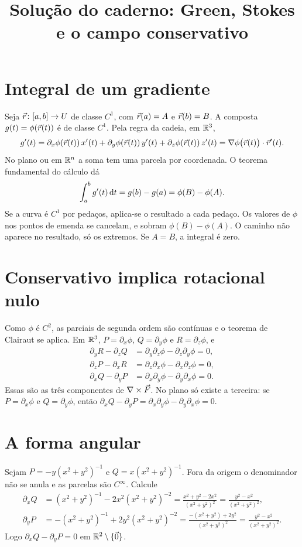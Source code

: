 \documentclass[11pt,a4paper]{article}
\title{Solução do caderno: Green, Stokes e o campo conservativo}
\author{}
\date{}
\begin{document}
\maketitle
\tableofcontents

\section{Integral de um gradiente}

Seja $\vec{r}\colon[a,b]\to U$ de classe $C^1$, com $\vec{r}(a)=A$ e $\vec{r}(b)=B$. A composta $g(t)=\phi(\vec{r}(t))$ é de classe $C^1$. Pela regra da cadeia, em $\mathbb{R}^3$,
\[
g'(t)
=\partial_x\phi(\vec{r}(t))\,x'(t)
+\partial_y\phi(\vec{r}(t))\,y'(t)
+\partial_z\phi(\vec{r}(t))\,z'(t)
=\nabla\phi\bigl(\vec{r}(t)\bigr)\cdot\vec{r}'(t).
\]
No plano ou em $\mathbb{R}^n$ a soma tem uma parcela por coordenada. O teorema fundamental do cálculo dá
\[
\int_a^b g'(t)\,\mathrm{d} t=g(b)-g(a)=\phi(B)-\phi(A).
\]
Se a curva é $C^1$ por pedaços, aplica-se o resultado a cada pedaço. Os valores de $\phi$ nos pontos de emenda se cancelam, e sobram $\phi(B)-\phi(A)$. O caminho não aparece no resultado, só os extremos. Se $A=B$, a integral é zero.

\section{Conservativo implica rotacional nulo}

Como $\phi$ é $C^2$, as parciais de segunda ordem são contínuas e o teorema de Clairaut se aplica. Em $\mathbb{R}^3$, $P=\partial_x\phi$, $Q=\partial_y\phi$ e $R=\partial_z\phi$, e
\begin{align*}
\partial_y R-\partial_z Q
&=\partial_y\partial_z\phi-\partial_z\partial_y\phi=0,\\
\partial_z P-\partial_x R
&=\partial_z\partial_x\phi-\partial_x\partial_z\phi=0,\\
\partial_x Q-\partial_y P
&=\partial_x\partial_y\phi-\partial_y\partial_x\phi=0.
\end{align*}
Essas são as três componentes de $\nabla\times\vec{F}$. No plano só existe a terceira: se $P=\partial_x\phi$ e $Q=\partial_y\phi$, então $\partial_x Q-\partial_y P=\partial_x\partial_y\phi-\partial_y\partial_x\phi=0$.

\section{A forma angular}

Sejam $P=-y(x^2+y^2)^{-1}$ e $Q=x(x^2+y^2)^{-1}$. Fora da origem o denominador não se anula e as parcelas são $C^\infty$. Calcule
\begin{align*}
\partial_x Q
&=(x^2+y^2)^{-1}-2x^2(x^2+y^2)^{-2}
=\frac{x^2+y^2-2x^2}{(x^2+y^2)^2}
=\frac{y^2-x^2}{(x^2+y^2)^2},\\
\partial_y P
&=-(x^2+y^2)^{-1}+2y^2(x^2+y^2)^{-2}
=\frac{-(x^2+y^2)+2y^2}{(x^2+y^2)^2}
=\frac{y^2-x^2}{(x^2+y^2)^2}.
\end{align*}
Logo $\partial_x Q-\partial_y P=0$ em $\mathbb{R}^2\setminus\{\vec{0}\}$.
\end{document}
